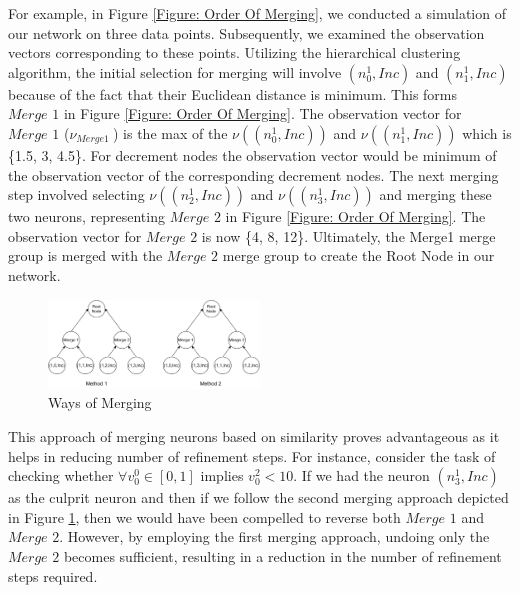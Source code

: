 For example, in Figure \ref{Figure: Order Of Merging}, we conducted a simulation of our network on three data points. Subsequently, we examined the observation vectors corresponding to these points. Utilizing the hierarchical clustering algorithm, the initial selection for merging  will involve $(n_0^{1}, Inc)$ and $(n_1^{1}, Inc)$ because of the fact that their Euclidean distance is minimum. This forms $\textit{Merge 1}$ in Figure \ref{Figure: Order Of Merging}. The observation vector for $\textit{Merge 1}$ ($\nu_\textit{Merge1 }$) is the max of the $\nu((n_0^{1}, Inc))$ and $\nu((n_1^{1},Inc))$ which is \{1.5, 3, 4.5\}. For decrement nodes the observation vector would be minimum of the observation vector of the corresponding decrement nodes. The next merging step involved selecting $\nu((n_2^{1}, Inc))$ and $\nu((n_3^{1}, Inc))$ and merging these two neurons, representing $\textit{Merge 2}$ in Figure \ref{Figure: Order Of Merging}. The observation vector for $\textit{Merge 2}$ is now \{4, 8, 12\}. Ultimately, the Merge1 merge group is merged with the $\textit{Merge 2}$ merge group to create the Root Node in our network.

\begin{figure}[H]
    \centering
    \includegraphics[width = 0.5\textwidth]{diagrams/good_vs_bad_merges.pdf}
    \caption{Ways of Merging}
    \label{Figure 3}
\end{figure}

This approach of merging neurons based on similarity proves advantageous as it helps in reducing number of refinement steps. For instance, consider the task of checking whether $\forall v_{0}^{0} \in [0, 1]$ implies $v_{0}^{2} < 10$. If we had the neuron $(n_{3}^{1}, Inc)$ as the culprit neuron and then if we follow the second merging approach depicted in Figure \ref{Figure 3}, then we would have been compelled to reverse both $\textit{Merge 1}$ and $\textit{Merge 2}$. However, by employing the first merging approach, undoing only the $\textit{Merge 2}$ becomes sufficient, resulting in a reduction in the number of refinement steps required.


